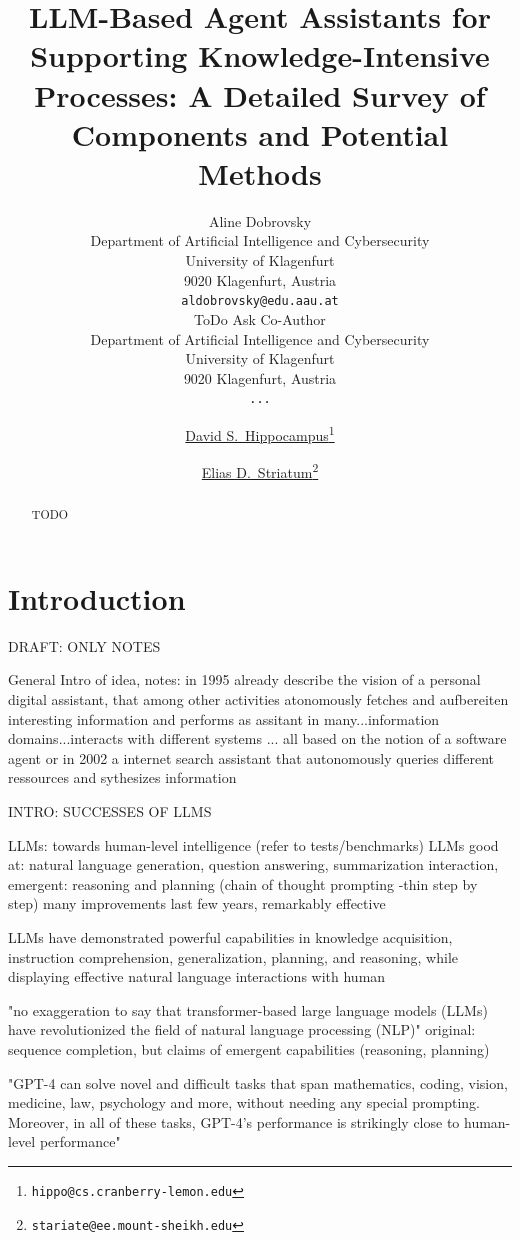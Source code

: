 \documentclass{article}
\title{LLM-Based Agent Assistants for Supporting Knowledge-Intensive Processes: A Detailed Survey of Components and Potential Methods } %
\author{ %
		{\hspace{1mm}Aline Dobrovsky}\\
		Department of Artificial Intelligence and Cybersecurity\\
		University of Klagenfurt\\
		9020 Klagenfurt, Austria \\
		\texttt{aldobrovsky@edu.aau.at} \\
	\And
	{%
		\hspace{1mm} ToDo Ask Co-Author} \\
	Department of Artificial Intelligence and Cybersecurity\\
	University of Klagenfurt\\
	9020 Klagenfurt, Austria\\
	\texttt{...} \\
}
\author[1]{%
	\href{https://orcid.org/0000-0000-0000-0000}{\usebox{\orcid}\hspace{1mm}David S.~Hippocampus\thanks{\texttt{hippo@cs.cranberry-lemon.edu}}}%
}
\author[1,2]{%
	\href{https://orcid.org/0000-0000-0000-0000}{\usebox{\orcid}\hspace{1mm}Elias D.~Striatum\thanks{\texttt{stariate@ee.mount-sheikh.edu}}}%
}
\affil[1]{Department of Computer Science, Cranberry-Lemon University, Pittsburgh, PA 15213}
\affil[2]{Department of Electrical Engineering, Mount-Sheikh University, Santa Narimana, Levand}
\begin{document}
\maketitle

\begin{abstract}
	TODO
%	
\end{abstract}



\section{Introduction}
DRAFT: ONLY NOTES

General Intro of idea, notes: 
\cite{wooldridge_intelligent_1995} in 1995 already describe the vision of a personal digital assistant, that among other activities atonomously fetches and aufbereiten interesting information and performs as assitant in many...information domains...interacts with different systems ... all based on the notion of a software agent
\cite{goos_intelligent_2002} or in 2002 a internet search assistant that autonomously queries different ressources and sythesizes information

INTRO: SUCCESSES OF LLMS 

LLMs: towards human-level intelligence (refer to tests/benchmarks) 
LLMs good at: natural language generation, question answering, summarization
interaction, emergent: reasoning and planning (chain of thought prompting -thin step by step)
many improvements last few years, 
remarkably effective

\cite{xi_rise_2023} LLMs have demonstrated powerful capabilities in knowledge acquisition, instruction comprehension, generalization, planning, and reasoning, while displaying effective natural language interactions with human

\cite{valmeekam_planning_2023} "no exaggeration to say that transformer-based large language models (LLMs) have revolutionized the field of natural language processing (NLP)"
original: sequence completion, but claims of emergent capabilities (reasoning, planning)

\cite{bubeck_sparks_2023} "GPT-4 can solve novel and difficult tasks that span mathematics, coding, vision, medicine, law, psychology and more, without needing any special prompting. Moreover, in all of these tasks, GPT-4’s performance is strikingly close to human-level performance"
\end{document}
